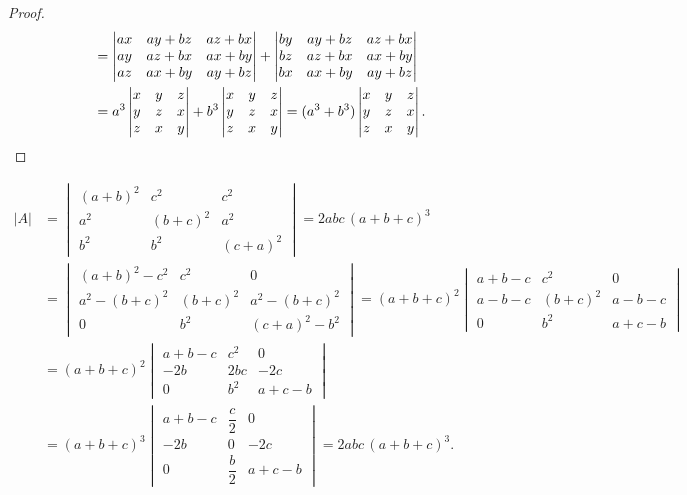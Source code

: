 
\begin{proof}
\begin{align*}
&=\begin{vmatrix}
ax&ay+bz&az+bx\\
ay&az+bx&ax+by\\
az&ax+by&ay+bz
\end{vmatrix}
+\begin{vmatrix}
by&ay+bz&az+bx\\
bz&az+bx&ax+by\\
bx&ax+by&ay+bz
\end{vmatrix}\\
&=a^3\begin{vmatrix}
x&y&z\\
y&z&x\\
z&x&y
\end{vmatrix}
+b^3\begin{vmatrix}
x&y&z\\
y&z&x\\
z&x&y
\end{vmatrix}
=(a^3+b^3)\begin{vmatrix}
x&y&z\\
y&z&x\\
z&x&y
\end{vmatrix}.\qedhere
\end{align*}
\end{proof}

\begin{example}
\begin{align*}
|A|&=\begin{vmatrix}
(a+b)^2&c^2&c^2\\
a^2&(b+c)^2&a^2\\
b^2&b^2&(c+a)^2
\end{vmatrix}
=2abc\,(a+b+c)^3\\
&=\begin{vmatrix}
(a+b)^2-c^2&c^2&0\\
a^2-(b+c)^2&(b+c)^2&a^2-(b+c)^2\\
0&b^2&(c+a)^2-b^2
\end{vmatrix}
=(a+b+c)^2\begin{vmatrix}
a+b-c&c^2&0\\
a-b-c&(b+c)^2&a-b-c\\
0&b^2&a+c-b
\end{vmatrix}\\
&=(a+b+c)^2\begin{vmatrix}
a+b-c&c^2&0\\
-2b&2bc&-2c\\
0&b^2&a+c-b
\end{vmatrix}\\
&=(a+b+c)^3\begin{vmatrix}
a+b-c&\dfrac{c}{2}&0\\
-2b&0&-2c\\
0&\dfrac{b}{2}&a+c-b
\end{vmatrix}
=2abc\,(a+b+c)^3 .
\end{align*}
\end{example}


